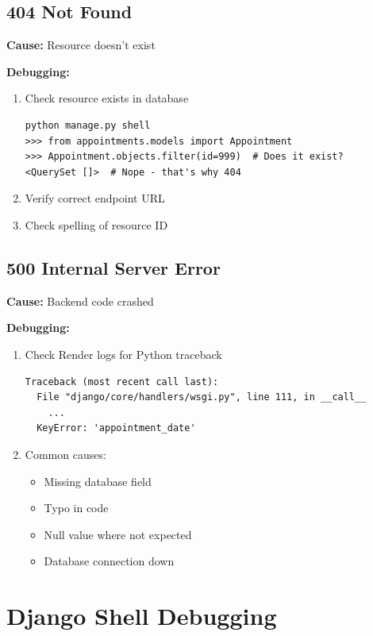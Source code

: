 \documentclass[11pt,a4paper,twoside]{report}
\begin{document}
\subsection{404 Not Found}

\textbf{Cause:} Resource doesn't exist

\textbf{Debugging:}
\begin{enumerate}
    \item Check resource exists in database
\begin{lstlisting}
python manage.py shell
>>> from appointments.models import Appointment
>>> Appointment.objects.filter(id=999)  # Does it exist?
<QuerySet []>  # Nope - that's why 404
\end{lstlisting}
    \item Verify correct endpoint URL
    \item Check spelling of resource ID
\end{enumerate}

\subsection{500 Internal Server Error}

\textbf{Cause:} Backend code crashed

\textbf{Debugging:}
\begin{enumerate}
    \item Check Render logs for Python traceback
\begin{verbatim}
Traceback (most recent call last):
  File "django/core/handlers/wsgi.py", line 111, in __call__
    ...
  KeyError: 'appointment_date'
\end{verbatim}
    
    \item Common causes:
    \begin{itemize}
        \item Missing database field
        \item Typo in code
        \item Null value where not expected
        \item Database connection down
    \end{itemize}
\end{enumerate}

\section{Django Shell Debugging}
\end{document}
